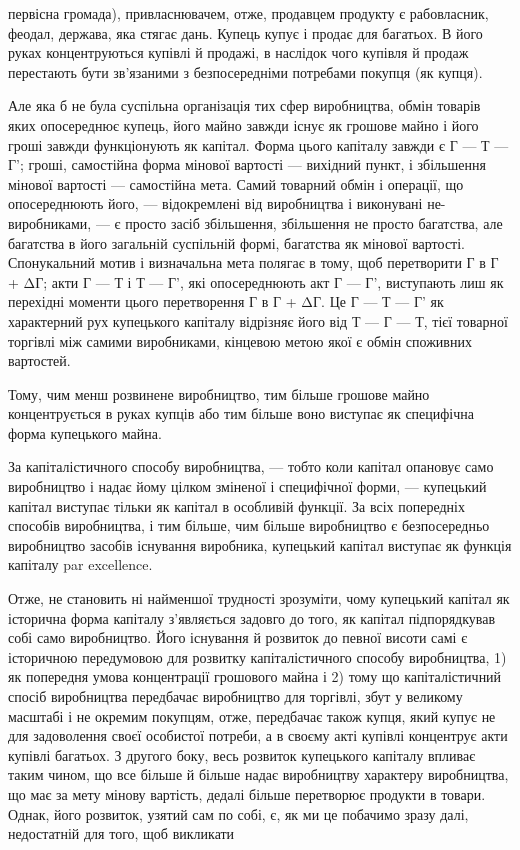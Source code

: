 первісна громада), привласнювачем, отже, продавцем продукту
є рабовласник, феодал, держава, яка стягає дань. Купець купує
і продає для багатьох. В його руках концентруються купівлі
й продажі, в наслідок чого купівля й продаж перестають
бути зв’язаними з безпосередніми потребами покупця (як
купця).

Але яка б не була суспільна організація тих сфер виробництва,
обмін товарів яких опосереднює купець, його майно завжди
існує як грошове майно і його гроші завжди функціонують
як капітал. Форма цього капіталу завжди є Г — Т — Г'; гроші,
самостійна форма мінової вартості — вихідний пункт, і збільшення
мінової вартості — самостійна мета. Самий товарний обмін і операції,
що опосереднюють його, — відокремлені від виробництва
і виконувані не-виробниками, — є просто засіб збільшення, збільшення
не просто багатства, але багатства в його загальній суспільній
формі, багатства як мінової вартості. Спонукальний мотив
і визначальна мета полягає в тому, щоб перетворити Г в Г + ΔГ;
акти Г — Т і Т — Г', які опосереднюють акт Г — Г', виступають
лиш як перехідні моменти цього перетворення Г в Г + ΔГ. Це
Г — Т — Г' як характерний рух купецького капіталу відрізняє його
від Т — Г — Т, тієї товарної торгівлі між самими виробниками,
кінцевою метою якої є обмін споживних вартостей.

Тому, чим менш розвинене виробництво, тим більше грошове
майно концентрується в руках купців або тим більше воно виступає
як специфічна форма купецького майна.

За капіталістичного способу виробництва, — тобто коли капітал
опановує само виробництво і надає йому цілком зміненої
і специфічної форми, — купецький капітал виступає тільки як
капітал в особливій функції. За всіх попередніх способів виробництва,
і тим більше, чим більше виробництво є безпосередньо
виробництво засобів існування виробника, купецький капітал
виступає як функція капіталу par excellence.

Отже, не становить ні найменшої трудності зрозуміти, чому
купецький капітал як історична форма капіталу з’являється задовго
до того, як капітал підпорядкував собі само виробництво.
Його існування й розвиток до певної висоти самі є історичною
передумовою для розвитку капіталістичного способу
виробництва, 1) як попередня умова концентрації грошового
майна і 2) тому що капіталістичний спосіб виробництва передбачає
виробництво для торгівлі, збут у великому масштабі і не
окремим покупцям, отже, передбачає також купця, який купує
не для задоволення своєї особистої потреби, а в своєму акті купівлі
концентрує акти купівлі багатьох. З другого боку, весь
розвиток купецького капіталу впливає таким чином, що все
більше й більше надає виробництву характеру виробництва, що
має за мету мінову вартість, дедалі більше перетворює продукти
в товари. Однак, його розвиток, узятий сам по собі, є, як
ми це побачимо зразу далі, недостатній для того, щоб викликати
